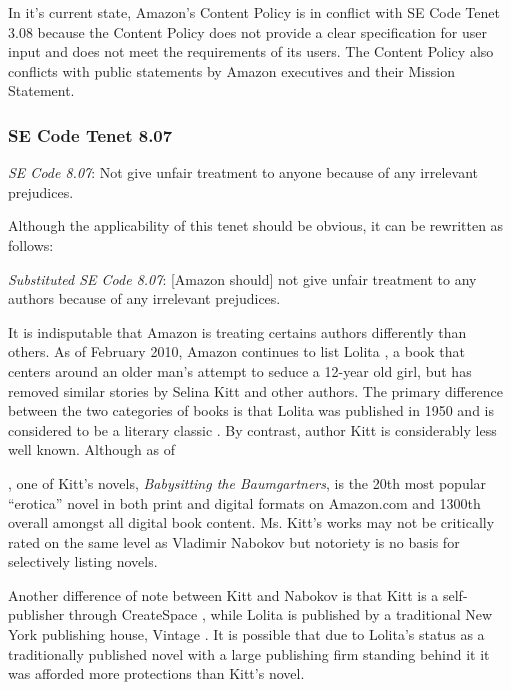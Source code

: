 \documentclass[11pt]{article}
\begin{document}
\begin{multicols}{2}
In it's current state, Amazon's Content Policy is in conflict with SE Code Tenet 3.08 because the Content Policy does not provide a clear specification for user input and does not meet the requirements of its users.  The Content Policy also conflicts with public statements by Amazon executives and their Mission Statement.

\subsubsection{SE Code Tenet 8.07}

\emph{SE Code 8.07}: Not give unfair treatment to anyone because of any irrelevant prejudices.

Although the applicability of this tenet should be obvious, it can be rewritten as follows:

\emph{Substituted SE Code 8.07}: [Amazon should] not give unfair treatment to any authors because of any irrelevant prejudices.

It is indisputable that Amazon is treating certains authors differently than others.  As of February 2010, Amazon continues to list Lolita \cite{AmazonLolitaDTPListing}, a book that centers around an older man's attempt to seduce a 12-year old girl, but has removed similar stories by Selina Kitt and other authors. \cite{KittSelfPubRevolution}  The primary difference between the two categories of books is that Lolita was published in 1950 \cite{WikipediaLolita} and is considered to be a literary classic \cite{MLTop100}.  By contrast, author Kitt is considerably less well known. Although as of \date{February 24, 2011}, one of Kitt's novels, \emph{Babysitting the Baumgartners}, is the 20th most popular ``erotica'' novel in both print and digital formats on Amazon.com and 1300th overall amongst all digital book content. \cite{AmazonBabysittingListing} Ms. Kitt's works may not be critically rated on the same level as Vladimir Nabokov but notoriety is no basis for selectively listing novels.

Another difference of note between Kitt and Nabokov is that Kitt is a self-publisher through CreateSpace \cite{KittSelfPubRevolution}, while Lolita is published by a traditional New York publishing house, Vintage \cite{WorldCatLolita}. It is possible that due to Lolita's status as a traditionally published novel with a large publishing firm standing behind it it was afforded more protections than Kitt's novel.  


\end{multicols}
\end{document}
